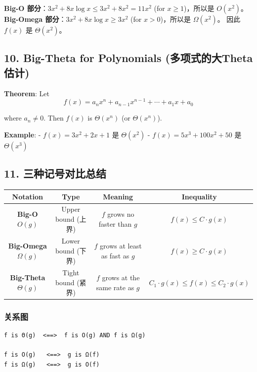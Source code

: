 \documentclass[10pt,a4paper,openany]{ctexbook}
\theoremstyle{definition}
\theoremstyle{remark}
\renewenvironment{quote}
  {\list{}{\leftmargin=1em\rightmargin=0pt\topsep=0.5pt\partopsep=0pt}\item[]}
  {\endlist}
\begin{document}
\textbf{Big-O 部分}：$3x^2 + 8x \log x \leq 3x^2 + 8x^2 = 11x^2$ (for $x \geq 1$)，所以是 $O(x^2)$。
\textbf{Big-Omega 部分}：$3x^2 + 8x \log x \geq 3x^2$ (for $x > 0$)，所以是 $\Omega(x^2)$。
因此 $f(x)$ 是 $\Theta(x^2)$。
\vspace{-2pt}

\subsection{10. Big-Theta for Polynomials (多项式的大Theta估计)}

\begin{quote}
\textbf{Theorem}: Let
\[
f(x) = a_n x^n + a_{n-1} x^{n-1} + \cdots + a_1 x + a_0
\]

where $a_n \neq 0$. Then $f(x)$ is $\Theta(x^n)$ (or $\Theta(x^n)$).

\textbf{Example}:
- $f(x) = 3x^2 + 2x + 1$ 是 $\Theta(x^2)$
- $f(x) = 5x^3 + 100x^2 + 50$ 是 $\Theta(x^3)$

\end{quote}
\vspace{-2pt}

\subsection{11. 三种记号对比总结}

\begin{center}
\begin{tabular}{cccc}
\hline
Notation & Type & Meaning & Inequality \\ \hline
\textbf{Big-O} $O(g)$ & Upper bound (上界) & $f$ grows no faster than $g$ & $f(x) \leq C \cdot g(x)$ \\
\textbf{Big-Omega} $\Omega(g)$ & Lower bound (下界) & $f$ grows at least as fast as $g$ & $f(x) \geq C \cdot g(x)$ \\
\textbf{Big-Theta} $\Theta(g)$ & Tight bound (紧界) & $f$ grows at the same rate as $g$ & $C_1 \cdot g(x) \leq f(x) \leq C_2 \cdot g(x)$ \\
\hline
\end{tabular}

\end{center}

\subsubsection{关系图}

{\footnotesize\begin{verbatim}
f is Θ(g)  <==>  f is O(g) AND f is Ω(g)

f is O(g)   <==>  g is Ω(f)
f is Ω(g)   <==>  g is O(f)
\end{verbatim}}
\end{document}

